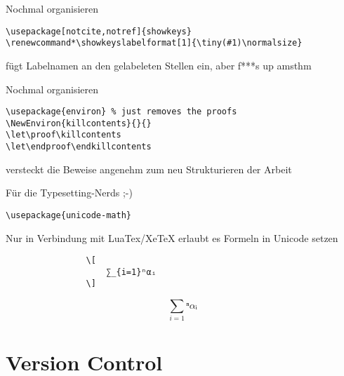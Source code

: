 \documentclass{beamer}
\begin{document}
\begin{frame}[fragile]{Nochmal organisieren}
    \footnotesize
    \begin{verbatim}
\usepackage[notcite,notref]{showkeys}
\renewcommand*\showkeyslabelformat[1]{\tiny(#1)\normalsize}
    \end{verbatim}
    \normalsize
fügt Labelnamen an den gelabeleten Stellen ein, aber f***s up amsthm
\end{frame}

\begin{frame}[fragile]{Nochmal organisieren}
    \footnotesize
    \begin{verbatim}
\usepackage{environ} % just removes the proofs
\NewEnviron{killcontents}{}{}
\let\proof\killcontents
\let\endproof\endkillcontents
    \end{verbatim}
    \normalsize
versteckt die Beweise angenehm zum neu Strukturieren der Arbeit
\end{frame}

\begin{frame}[fragile]{Für die Typesetting-Nerds ;-)}
    \begin{verbatim}
\usepackage{unicode-math}
    \end{verbatim}
    Nur in Verbindung mit LuaTex/XeTeX erlaubt es Formeln in Unicode setzen
    \begin{verbatim}
                \[
                    ∑_{i=1}ⁿαᵢ
                \]
    \end{verbatim}
        \[
            ∑_{i=1}ⁿαᵢ
        \]
\end{frame}

\section{Version Control}
\label{sec:version_control}

\subsection{}
\end{document}
